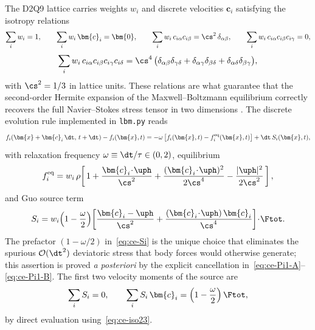 The D2Q9 lattice carries weights $w_i$ and discrete velocities $\bm{c}_i$ satisfying the isotropy relations
\begin{equation}
\sum_i w_i = 1,\qquad \sum_i w_i\,\bm{c}_i = \bm{0},\qquad \sum_i w_i\,c_{i\alpha}c_{i\beta} = \cs^{2}\,\delta_{\alpha\beta},\qquad \sum_i w_i\,c_{i\alpha}c_{i\beta}c_{i\gamma} = 0,
\label{eq:ce-iso23}
\end{equation}
\begin{equation}
\sum_i w_i\,c_{i\alpha}c_{i\beta}c_{i\gamma}c_{i\delta} = \cs^{4}\,\bigl(\delta_{\alpha\beta}\delta_{\gamma\delta} + \delta_{\alpha\gamma}\delta_{\beta\delta} + \delta_{\alpha\delta}\delta_{\beta\gamma}\bigr),
\label{eq:ce-iso4}
\end{equation}
with $\cs^{2} = 1/3$ in lattice units.
These relations are what guarantee that the second-order Hermite expansion of the Maxwell--Boltzmann equilibrium correctly recovers the full Navier--Stokes stress tensor in two dimensions \cite{chen1998lattice}.
The discrete evolution rule implemented in \texttt{lbm.py} reads
\begin{equation}
f_i(\bm{x} + \bm{c}_i\,\dt,\,t + \dt) - f_i(\bm{x}, t) = -\omega\,\bigl[f_i(\bm{x}, t) - f_i^{\mathrm{eq}}(\bm{x}, t)\bigr] + \dt\,S_i(\bm{x}, t),
\label{eq:ce-lbm}
\end{equation}
with relaxation frequency $\omega \equiv \dt/\tau \in (0, 2)$, equilibrium
\begin{equation}
f_i^{\mathrm{eq}} = w_i\,\rho\!\left[\,1 + \frac{\bm{c}_i\!\cdot\!\uph}{\cs^{2}} + \frac{(\bm{c}_i\!\cdot\!\uph)^{2}}{2\cs^{4}} - \frac{|\uph|^{2}}{2\cs^{2}}\,\right],
\label{eq:ce-feq}
\end{equation}
and Guo source term \cite{guo2002discrete}
\begin{equation}
S_i = w_i\!\left(1 - \frac{\omega}{2}\right)\!\left[\frac{\bm{c}_i - \uph}{\cs^{2}} + \frac{(\bm{c}_i\!\cdot\!\uph)\,\bm{c}_i}{\cs^{4}}\right]\!\cdot\!\Ftot.
\label{eq:ce-Si}
\end{equation}
The prefactor $(1 - \omega/2)$ in~\eqref{eq:ce-Si} is the unique choice that eliminates the spurious $\mathcal{O}(\dt^{2})$ deviatoric stress that body forces would otherwise generate;
this assertion is proved \emph{a posteriori} by the explicit cancellation in~\eqref{eq:ce-Pi1-A}--\eqref{eq:ce-Pi1-B}.
The first two velocity moments of the source are
\begin{equation}
\sum_i S_i = 0,\qquad \sum_i S_i\,\bm{c}_i = \left(1 - \frac{\omega}{2}\right)\Ftot,
\label{eq:ce-Smom}
\end{equation}
by direct evaluation using~\eqref{eq:ce-iso23}.

